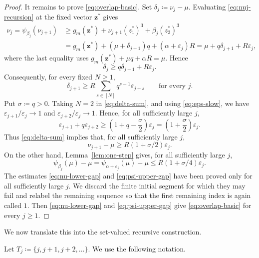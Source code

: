 \documentclass[10pt]{article}
\numberwithin{equation}{section}
\newcommand{\eps}{\varepsilon}
\begin{document}
\begin{proof}
It remains to prove \eqref{eq:overlap-basic}. Set $\delta_j\coloneqq \nu_j-\mu$. Evaluating \eqref{eq:nuj-recursion} at the fixed vector $\mathbf{z}^*$ gives
\begin{align*}
        \nu_j
        =\psi_{\beta_j}(\nu_{j+1})
        &\ge g_m(\mathbf{z}^*)+\nu_{j+1}(z_1^*)^3+\beta_j(z_2^*)^3  \\
        &=g_m(\mathbf{z}^*)+(\mu+\delta_{j+1})q+(\alpha+\eps_j)R 
        =\mu+q\delta_{j+1}+R\eps_j,
\end{align*}
where the last equality uses $g_m(\mathbf{z}^*)+\mu q+\alpha R=\mu$. Hence
\begin{equation}
        \delta_j\ge q\delta_{j+1}+R\eps_j.
        \label{eq:delta-recursion}
\end{equation}
Consequently, for every fixed $N\ge 1$,
\begin{equation}
        \delta_{j+1} \ge R\sum_{s\in[N]} q^{s-1}\eps_{j+s} \qquad\text{for every }j.
        \label{eq:delta-sum}
\end{equation}
Put $\sigma\coloneqq q>0$. Taking $N=2$ in \eqref{eq:delta-sum}, and using \eqref{eq:eps-slow}, we have $\eps_{j+1}/\eps_j\to 1$ and $\eps_{j+2}/\eps_j\to 1$. Hence, for all sufficiently large $j$,
\[
        \eps_{j+1}+q\eps_{j+2}
        \ge \left(1+q-\frac{\sigma}{2}\right)\eps_j
        =\left(1+\frac{\sigma}{2}\right)\eps_j.
\]
Thus \eqref{eq:delta-sum} implies that, for all sufficiently large $j$,
\begin{equation}
        \nu_{j+1}-\mu\ge R(1+\sigma/2)\eps_j.
        \label{eq:nu-lower-gap}
\end{equation}
On the other hand, Lemma~\ref{lem:one-step} gives, for all sufficiently large $j$,
\begin{equation}
        \psi_{\beta_j}(\mu)-\mu =\psi_{\alpha+\eps_j}(\mu)-\mu \le R(1+\sigma/4)\eps_j.
        \label{eq:psi-upper-gap}
\end{equation}
The estimates \eqref{eq:nu-lower-gap} and \eqref{eq:psi-upper-gap} have been proved only for all sufficiently large $j$. We discard the finite initial segment for which they may fail and relabel the remaining sequence so that the first remaining index is again called $1$. Then \eqref{eq:nu-lower-gap} and \eqref{eq:psi-upper-gap} give \eqref{eq:overlap-basic} for every $j\ge 1$.
\end{proof}

We now translate this into the set-valued recursive construction.

Let $T_j\coloneqq \{j,j+1,j+2,\ldots\}$. We use the following notation.
\end{document}

